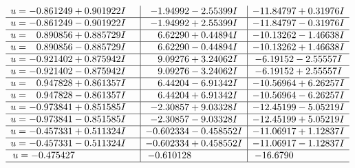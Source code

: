 \documentclass[1p]{elsarticle_modified}
\theoremstyle{definition}
\begin{document}
$$\begin{array}{c|c|c}
\begin{aligned}
u &= -0.861249 + 0.901922 I\end{aligned}
 & -1.94992 - 2.55399 I & -11.84797 + 0.31976 I \\ \hline\begin{aligned}
u &= -0.861249 - 0.901922 I\end{aligned}
 & -1.94992 + 2.55399 I & -11.84797 - 0.31976 I \\ \hline\begin{aligned}
u &= \phantom{-}0.890856 + 0.885729 I\end{aligned}
 & \phantom{-}6.62290 + 0.44894 I & -10.13262 - 1.46638 I \\ \hline\begin{aligned}
u &= \phantom{-}0.890856 - 0.885729 I\end{aligned}
 & \phantom{-}6.62290 - 0.44894 I & -10.13262 + 1.46638 I \\ \hline\begin{aligned}
u &= -0.921402 + 0.875942 I\end{aligned}
 & \phantom{-}9.09276 + 3.24062 I & -6.19152 - 2.55557 I \\ \hline\begin{aligned}
u &= -0.921402 - 0.875942 I\end{aligned}
 & \phantom{-}9.09276 - 3.24062 I & -6.19152 + 2.55557 I \\ \hline\begin{aligned}
u &= \phantom{-}0.947828 + 0.861357 I\end{aligned}
 & \phantom{-}6.44204 - 6.91342 I & -10.56964 + 6.26257 I \\ \hline\begin{aligned}
u &= \phantom{-}0.947828 - 0.861357 I\end{aligned}
 & \phantom{-}6.44204 + 6.91342 I & -10.56964 - 6.26257 I \\ \hline\begin{aligned}
u &= -0.973841 + 0.851585 I\end{aligned}
 & -2.30857 + 9.03328 I & -12.45199 - 5.05219 I \\ \hline\begin{aligned}
u &= -0.973841 - 0.851585 I\end{aligned}
 & -2.30857 - 9.03328 I & -12.45199 + 5.05219 I \\ \hline\begin{aligned}
u &= -0.457331 + 0.511324 I\end{aligned}
 & -0.602334 - 0.458552 I & -11.06917 + 1.12837 I \\ \hline\begin{aligned}
u &= -0.457331 - 0.511324 I\end{aligned}
 & -0.602334 + 0.458552 I & -11.06917 - 1.12837 I \\ \hline\begin{aligned}
u &= -0.475427\phantom{ +0.000000I}\end{aligned}
 & -0.610128\phantom{ +0.000000I} & -16.6790\phantom{ +0.000000I}\\
 \hline 
 \end{array}$$\newpage
\end{document}

